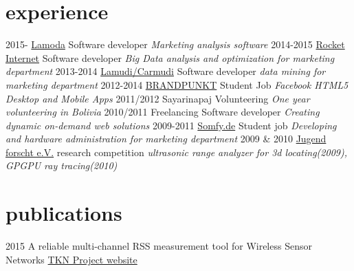 \documentclass[]{friggeri-cv}
\begin{document}
\section{experience}

\begin{entrylist}
  \entry
    {2015-}
    {\href{http://www.rocket-internet.com/}{Lamoda}}
    {Software developer}
    {\emph{Marketing analysis software}}
  \entry
    {2014-2015}
    {\href{http://www.rocket-internet.com/}{Rocket Internet}}
    {Software developer}
    {\emph{Big Data analysis and optimization for marketing department}}
  \entry
    {2013-2014}
    {\href{http://www.lamudi.com/}{Lamudi/Carmudi}}
    {Software developer}
    {\emph{data mining for marketing department}}
  \entry
    {2012-2014}
    {\href{http://brandpunkt.com}{BRANDPUNKT}}
    {Student Job}
    {\emph{Facebook HTML5 Desktop and Mobile Apps}}
  \entry
    {2011/2012}
    {Sayarinapaj}
    {Volunteering}
    {\emph{One year volunteering in Bolivia}}
  \entry
    {2010/2011}
    {Freelancing}
    {Software developer}
    {\emph{Creating dynamic on-demand web solutions}}
  \entry
    {2009-2011}
    {\href{http://www.somfy.de}{Somfy.de}}
    {Student job}
    {\emph{Developing and hardware administration for marketing department }}
  \entry
    {2009 \& 2010}
    {\href{http://jugend-forscht.de}{Jugend forscht e.V.}}
    {research competition}
    {\emph{ultrasonic range analyzer for 3d locating(2009), GPGPU ray tracing(2010)}}
\end{entrylist}

%

\section{publications}

\begin{entrylist}
  \entry
    {2015}
    {A reliable multi-channel RSS measurement tool for Wireless Sensor Networks}
    {\href{http://www.tkn.tu-berlin.de/index.php?id=159554}{TKN Project website}}
    {}
\end{entrylist}
\end{document}
